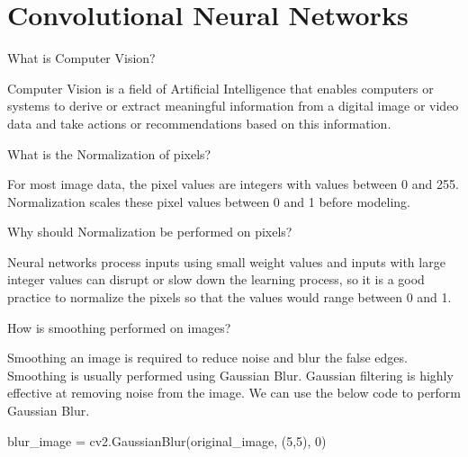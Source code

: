 	\chapter{Convolutional Neural Networks}

	\resetquestioncounter{}
	\begin{qanda}
		\begin{question}
 What is Computer Vision?
		\end{question}
		\begin{answer}
Computer Vision is a field of Artificial Intelligence that enables computers or systems to derive or extract meaningful information from a digital image or video data and take actions or recommendations based on this information.
		\end{answer}
	\end{qanda}

	\begin{qanda}
		\begin{question}
 What is the Normalization of pixels?
		\end{question}
		\begin{answer}
For most image data, the pixel values are integers with values between 0 and 255. Normalization scales these pixel values between 0 and 1 before modeling.
		\end{answer}
	\end{qanda}

	\begin{qanda}
		\begin{question}
Why should Normalization be performed on pixels?
		\end{question}
		\begin{answer}
Neural networks process inputs using small weight values and inputs with large integer values can disrupt or slow down the learning process, so it is a good practice to normalize the pixels so that the values would range between 0 and 1.
		\end{answer}
	\end{qanda}

	\begin{qanda}
		\begin{question}
How is smoothing performed on images?
		\end{question}
		\begin{answer}
Smoothing an image is required to reduce noise and blur the false edges. Smoothing is usually performed using Gaussian Blur. Gaussian filtering is highly effective at removing noise from the image. We can use the below code to perform Gaussian Blur.

		\begin{code}[\codenumbering]{}
			\codeitemnonumber blur\_image = cv2.GaussianBlur(original\_image, (5,5), 0)
		\end{code}
		\end{answer}
	\end{qanda}


